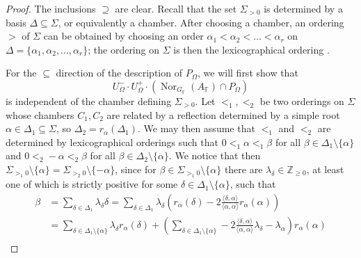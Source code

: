 \documentclass[12pt]{amsart}
\newcommand{\F}{\mathbb{F} }
\newcommand{\Z}{\mathbb{Z} }
\numberwithin{equation}{section}
\theoremstyle{remark} %
\begin{document}
		\begin{proof}
			The inclusions $\supseteq$ are clear. Recall that the set $\Sigma_{>0}$ is determined by a basis $\Delta \subseteq \Sigma$, or equivalently a chamber. After choosing a chamber, an ordering $>$ of $\Sigma$ can be obtained by choosing an order $\alpha_1 < \alpha_2 < \ldots < \alpha_r$ on $\Delta = \{ \alpha_1, \alpha_2, \ldots , \alpha_r \}$; the ordering on $\Sigma$ is then the lexicographical ordering \cite[VI.1.6, p. 174-175]{Bou08}. 
			
			For the $\subseteq$ direction of the description of $P_\Omega$, we will first show that 
			$$
			U_\Omega^- \cdot U_\Omega^+ \cdot(\operatorname{Nor}_{G_\F}(A_\F)\cap P_{\Omega})
			$$
			is independent of the chamber defining $\Sigma_{>0}$.
			Let $<_1, <_2$ be two orderings on $\Sigma$ whose chambers $C_1, C_2$ are related by a reflection determined by a simple root $\alpha \in \Delta_1 \subseteq \Sigma$, so $\Delta_2 = r_\alpha(\Delta_1)$. We may then assume that $<_1$ and $<_2$ are determined by lexicographical orderings such that $0 <_1 \alpha <_1 \beta$ for all $\beta \in \Delta_{1} \setminus \{\alpha\}$ and $0 <_2 -\alpha <_2 \beta$ for all $\beta \in \Delta_2\setminus \{\alpha\}$. We notice that then $\Sigma_{>_1 0} \setminus \{\alpha\} = \Sigma_{>_2 0} \setminus \{-\alpha\}$, since %
			for $\beta \in \Sigma_{>_1 0}\setminus \{\alpha\}$ there are $\lambda_{\delta} \in \Z_{\geq 0}$, at least one of which is strictly positive for some $\delta \in \Delta_1 \setminus \{\alpha\}$, such that
			\begin{align*}
				\beta &= \sum_{\delta\in \Delta_1} \lambda_\delta \delta 
				= \sum_{\delta \in \Delta_1} \lambda_\delta \left(r_\alpha(\delta) - 2\frac{\langle \delta, \alpha\rangle}{\langle \alpha, \alpha\rangle} r_\alpha(\alpha)\right) \\
				&= \sum_{\delta \in \Delta_1 \setminus \{ \alpha\}} \lambda_\delta r_\alpha(\delta) + \left(\sum_{\delta \in \Delta_1 \setminus \{\alpha\}} - 2 \frac{\langle\delta,\alpha\rangle}{\langle \alpha, \alpha \rangle} \lambda_\delta - \lambda_\alpha \right) r_\alpha(\alpha)  \\

\end{align*}
\end{proof}
\end{document}
